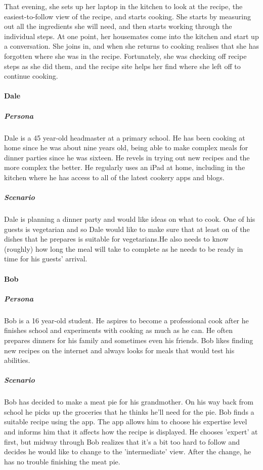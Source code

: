 That evening, she sets up her laptop in the kitchen to look at the recipe,
the easiest-to-follow view of the recipe, and starts cooking. She starts by 
measuring out all the ingredients she will need, and then starts working through
the individual steps. At one point, her housemates come into the kitchen and 
start up a conversation. She joins in, and when she returns to cooking realises
that she has forgotten where she was in the recipe. Fortunately, she was
checking off recipe steps as she did them, and the recipe site helps her find
where she left off to continue cooking.

\paragraph{Dale}
\subparagraph{Persona}
Dale is a 45 year-old headmaster at a primary school. He has been cooking at home
since he was about nine years old, being able to make complex meals for dinner
parties since he was sixteen. He revels in trying out new recipes and the more
complex the better. He regularly uses an iPad at home, including in the kitchen
where he has access to all of the latest cookery apps and blogs.
\subparagraph{Scenario}
Dale is planning a dinner party and would like ideas on what to cook. One of his
guests is vegetarian and so Dale would like to make sure that at least on of the
dishes that he prepares is suitable for vegetarians.He also needs to know (roughly) 
how long the meal will take to complete as he needs to be ready in time for his 
guests' arrival.

\paragraph{Bob}
\subparagraph{Persona}
Bob is a 16 year-old student. He aspires to become a professional cook after he 
finishes school and experiments with cooking as much as he can. He often prepares
dinners for his family and sometimes even his friends. Bob likes finding new
recipes on the internet and always looks for meals that would test his abilities.
\subparagraph{Scenario}
Bob has decided to make a meat pie for his grandmother. On his way back from 
school he picks up the groceries that he thinks he'll need for the pie. Bob finds
a suitable recipe using the app. The app allows him to choose his expertise level
and informs him that it affects how the recipe is displayed. He chooses 'expert'
at first, but midway through Bob realizes that it's a bit too hard to follow and
decides he would like to change to the 'intermediate' view. After the change, he
has no trouble finishing the meat pie.

